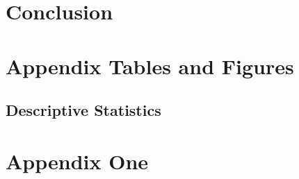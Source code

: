 \documentclass[12pt]{article}
\begin{document}
\section{Conclusion\
\label{sec:conclusion}}

\clearpage
\begin{singlespace}
%
%


\end{singlespace}


\newpage
\appendix
\setcounter{table}{0}
\renewcommand{\tablename}{Appendix Table}
\renewcommand{\figurename}{Appendix Figure}
\renewcommand{\thetable}{A\arabic{table}}
\setcounter{figure}{0}
\renewcommand{\thefigure}{A\arabic{figure}}

\section{Appendix Tables and Figures}
\subsection{Descriptive Statistics}


\label{tab:1}
\newpage


\newpage 
\section{Appendix One \label{sec:appendix:first}}
\renewcommand{\thetable}{B\arabic{table}}
\setcounter{table}{0}
\renewcommand{\thefigure}{B\arabic{figure}}
\setcounter{figure}{0}
\end{document}

